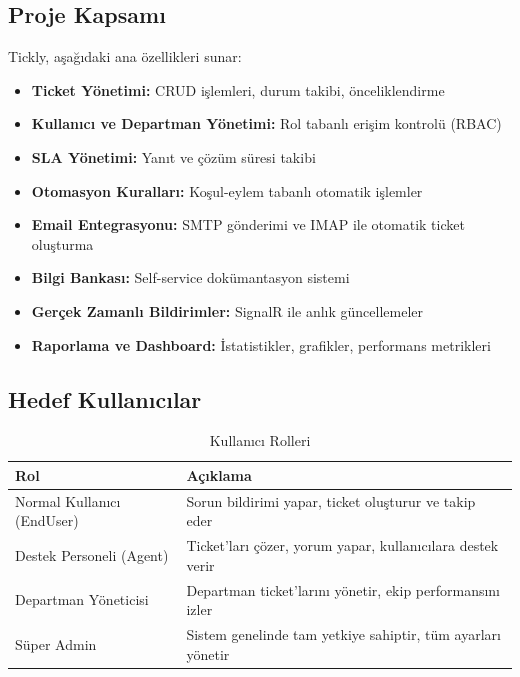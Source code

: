 \documentclass[12pt,a4paper]{article}
\begin{document}
\subsection{Proje Kapsamı}

Tickly, aşağıdaki ana özellikleri sunar:

\begin{itemize}
    \item \textbf{Ticket Yönetimi:} CRUD işlemleri, durum takibi, önceliklendirme
    \item \textbf{Kullanıcı ve Departman Yönetimi:} Rol tabanlı erişim kontrolü (RBAC)
    \item \textbf{SLA Yönetimi:} Yanıt ve çözüm süresi takibi
    \item \textbf{Otomasyon Kuralları:} Koşul-eylem tabanlı otomatik işlemler
    \item \textbf{Email Entegrasyonu:} SMTP gönderimi ve IMAP ile otomatik ticket oluşturma
    \item \textbf{Bilgi Bankası:} Self-service dokümantasyon sistemi
    \item \textbf{Gerçek Zamanlı Bildirimler:} SignalR ile anlık güncellemeler
    \item \textbf{Raporlama ve Dashboard:} İstatistikler, grafikler, performans metrikleri
\end{itemize}

\subsection{Hedef Kullanıcılar}

\begin{table}[h]
\centering
\begin{tabular}{|l|p{10cm}|}
\hline
\textbf{Rol} & \textbf{Açıklama} \\
\hline
Normal Kullanıcı (EndUser) & Sorun bildirimi yapar, ticket oluşturur ve takip eder \\
\hline
Destek Personeli (Agent) & Ticket'ları çözer, yorum yapar, kullanıcılara destek verir \\
\hline
Departman Yöneticisi & Departman ticket'larını yönetir, ekip performansını izler \\
\hline
Süper Admin & Sistem genelinde tam yetkiye sahiptir, tüm ayarları yönetir \\
\hline
\end{tabular}
\caption{Kullanıcı Rolleri}
\end{table}

\newpage
\end{document}
